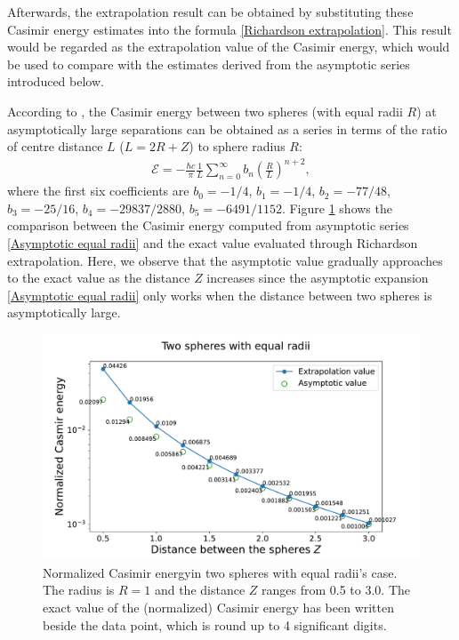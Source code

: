 Afterwards, the extrapolation result can be obtained by substituting these Casimir energy estimates into 
the formula \eqref{Richardson extrapolation}. This result would be regarded as the extrapolation value of the Casimir energy, which would be used to compare with the 
estimates derived from the asymptotic series introduced below. 

According to \cite{emig2008casimir}, the Casimir energy between two spheres (with equal radii $R$) at asymptotically 
large separations can be obtained as a series in terms of the ratio of centre distance $L$ ($L = 2R + Z$) to sphere radius $R$:
\begin{align}\label{Asymptotic equal radii}
   \mathcal{E} = -\frac{\hbar c}{\pi}\frac{1}{L}\sum_{n=0}^{\infty}b_{n}\left(\frac{R}{L}\right)^{n+2},
\end{align}
where the first six coefficients are 
$b_{0} = -1/4$, $b_{1} = -1/4$,  $b_{2} = -77/48$,  $b_{3} = -25/16$,  $b_{4} = -29837/2880$, $b_{5} = -6491/1152$. Figure 
\ref{Casimir energy between spheres with equal radii} shows the comparison between the Casimir energy computed from asymptotic series 
\eqref{Asymptotic equal radii} and the exact value evaluated through {Richardson extrapolation}. Here, we observe that the asymptotic value gradually 
approaches to the exact value as the distance $Z$ increases since the asymptotic expansion \eqref{Asymptotic equal radii} only works when the distance 
between two spheres is asymptotically large.

\begin{figure}[H]
    \centering
    \includegraphics[scale = 0.5]{figures/Spheres_equal_CasE.pdf}
    \caption[Caption for LOF]{Normalized Casimir energy\protect\footnotemark in two spheres with equal radii's case. The radius is $R = 1$ and the distance $Z$ 
    ranges from 0.5 to 3.0. The exact value of the (normalized) Casimir energy has been written beside the data point, which is round up to 4 significant digits.}
    \label{Casimir energy between spheres with equal radii}
\end{figure}

